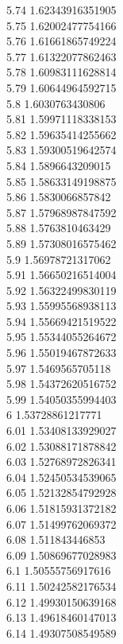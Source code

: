 {5.74	1.62343916351905\\
5.75	1.62002477754166\\
5.76	1.61661865749224\\
5.77	1.61322077862463\\
5.78	1.60983111628814\\
5.79	1.60644964592715\\
5.8	1.6030763430806\\
5.81	1.59971118338153\\
5.82	1.59635414255662\\
5.83	1.59300519642574\\
5.84	1.5896643209015\\
5.85	1.58633149198875\\
5.86	1.5830066857842\\
5.87	1.57968987847592\\
5.88	1.5763810463429\\
5.89	1.57308016575462\\
5.9	1.56978721317062\\
5.91	1.56650216514004\\
5.92	1.56322499830119\\
5.93	1.55995568938113\\
5.94	1.55669421519522\\
5.95	1.55344055264672\\
5.96	1.55019467872633\\
5.97	1.5469565705118\\
5.98	1.54372620516752\\
5.99	1.54050355994403\\
6	1.53728861217771\\
6.01	1.53408133929027\\
6.02	1.53088171878842\\
6.03	1.52768972826341\\
6.04	1.52450534539065\\
6.05	1.52132854792928\\
6.06	1.51815931372182\\
6.07	1.51499762069372\\
6.08	1.511843446853\\
6.09	1.50869677028983\\
6.1	1.50555756917616\\
6.11	1.50242582176534\\
6.12	1.49930150639168\\
6.13	1.49618460147013\\
6.14	1.49307508549589\\
}
